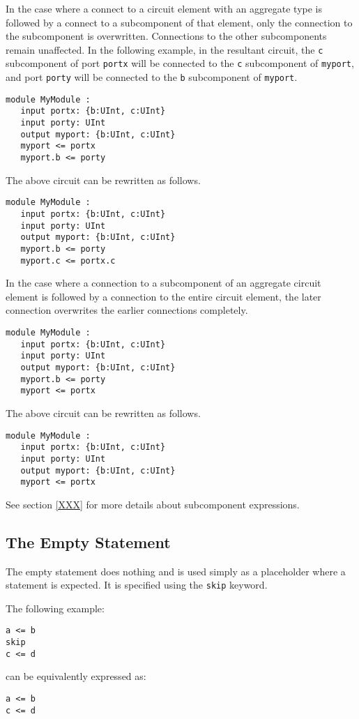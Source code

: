 \documentclass[12pt]{article}
\begin{document}
In the case where a connect to a circuit element with an aggregate type is followed by a connect to a subcomponent of that element, only the connection to the subcomponent is overwritten. Connections to the other subcomponents remain unaffected. In the following example, in the resultant circuit, the \verb|c| subcomponent of port \verb|portx| will be connected to the \verb|c| subcomponent of \verb|myport|, and port \verb|porty| will be connected to the \verb|b| subcomponent of \verb|myport|.
\begin{verbatim}
module MyModule :
   input portx: {b:UInt, c:UInt}
   input porty: UInt
   output myport: {b:UInt, c:UInt}
   myport <= portx
   myport.b <= porty
\end{verbatim}
The above circuit can be rewritten as follows.
\begin{verbatim}
module MyModule :
   input portx: {b:UInt, c:UInt}
   input porty: UInt
   output myport: {b:UInt, c:UInt}
   myport.b <= porty
   myport.c <= portx.c
\end{verbatim}

In the case where a connection to a subcomponent of an aggregate circuit element is followed by a connection to the entire circuit element, the later connection overwrites the earlier connections completely.

\begin{verbatim}
module MyModule :
   input portx: {b:UInt, c:UInt}
   input porty: UInt
   output myport: {b:UInt, c:UInt}
   myport.b <= porty
   myport <= portx
\end{verbatim}
The above circuit can be rewritten as follows.
\begin{verbatim}
module MyModule :
   input portx: {b:UInt, c:UInt}
   input porty: UInt
   output myport: {b:UInt, c:UInt}
   myport <= portx
\end{verbatim}

See section \ref{XXX} for more details about subcomponent expressions.

\subsection{The Empty Statement}
The empty statement does nothing and is used simply as a placeholder where a statement is expected. It is specified using the \verb|skip| keyword.

The following example:
\begin{verbatim}
a <= b
skip
c <= d
\end{verbatim}
can be equivalently expressed as:
\begin{verbatim}
a <= b
c <= d
\end{verbatim}
\end{document}
